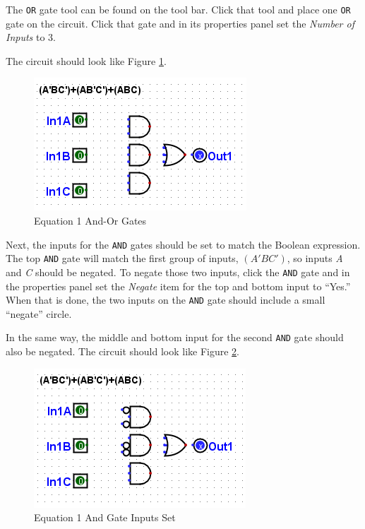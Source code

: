 The \texttt{OR} gate tool can be found on the tool bar. Click that tool and place one \texttt{OR} gate on the circuit. Click that gate and in its properties panel set the \textit{Number of Inputs} to 3.

The circuit should look like Figure \ref{fig:02-02}.

\begin{figure}[H]
	\centering
	\includegraphics[width=\maxwidth{.95\linewidth}]{gfx/02-02}
	\caption{Equation 1 And-Or Gates}
	\label{fig:02-02}
\end{figure}

Next, the inputs for the \texttt{AND} gates should be set to match the Boolean expression. The top \texttt{AND} gate will match the first group of inputs, $ (A'BC') $, so inputs \textit{A} and \textit{C} should be negated. To negate those two inputs, click the \texttt{AND} gate and in the properties panel set the \textit{Negate} item for the top and bottom input to ``Yes.'' When that is done, the two inputs on the \texttt{AND} gate should include a small ``negate'' circle.

In the same way, the middle and bottom input for the second \texttt{AND} gate should also be negated. The circuit should look like Figure \ref{fig:02-03}.

\begin{figure}[H]
	\centering
	\includegraphics[width=\maxwidth{.95\linewidth}]{gfx/02-03}
	\caption{Equation 1 And Gate Inputs Set}
	\label{fig:02-03}
\end{figure}

